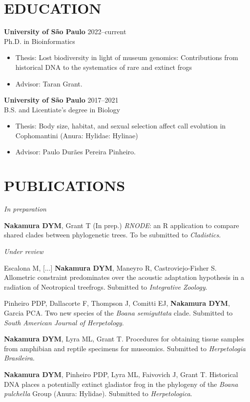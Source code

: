\documentclass[margin, 10pt]{res} %
\begin{document}
\begin{resume}
 
\section{EDUCATION}

\textbf{University of São Paulo} \hfill 2022--current \\
Ph.D. in Bioinformatics
\begin{itemize}
\item Thesis: Lost biodiversity in light of museum genomics: Contributions from historical DNA to the systematics of rare and extinct frogs
\item Advisor: Taran Grant.
\end{itemize} 

\textbf{University of São Paulo} \hfill 2017--2021 \\
B.S. and Licentiate's degree in Biology
\begin{itemize}
\item Thesis: Body size, habitat, and sexual selection affect call evolution in Cophomantini (Anura: Hylidae: Hylinae)
\item Advisor: Paulo Durães Pereira Pinheiro.
\end{itemize} 


\section{PUBLICATIONS}
{\sl In preparation}
\begin{etaremune}
\item \textbf{Nakamura DYM}, Grant T (In prep.) \emph{RNODE}: an R application to compare shared clades between phylogenetic trees. To be submitted to \emph{Cladistics}. 
\end{etaremune}

{\sl Under review}
\begin{etaremune}
\item Escalona M, [...] \textbf{Nakamura DYM}, Maneyro R, Castroviejo-Fisher S. Allometric constraint predominates over the acoustic adaptation hypothesis in a radiation of Neotropical treefrogs. Submitted to \emph{Integrative Zoology}.
\item Pinheiro PDP, Dallacorte F, Thompson J, Comitti EJ, \textbf{Nakamura DYM}, Garcia PCA. Two new species of the \emph{Boana semiguttata} clade. Submitted to \emph{South American Journal of Herpetology}. 
\item \textbf{Nakamura DYM}, Lyra ML, Grant T. Procedures for obtaining tissue samples from amphibian and reptile specimens for museomics. Submitted to \emph{Herpetologia Brasileira}. 
\item \textbf{Nakamura DYM}, Pinheiro PDP, Lyra ML, Faivovich J, Grant T. Historical DNA places a potentially extinct gladiator frog in the phylogeny of the \emph{Boana pulchella} Group (Anura: Hylidae). Submitted to \emph{Herpetologica}. 
\end{etaremune}


\end{resume}
\end{document}
